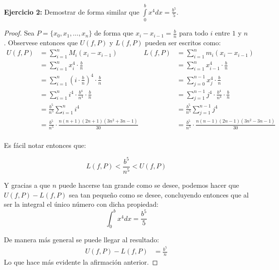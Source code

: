 \documentclass[../../main.tex]{subfiles}
\begin{document}
\question \textbf{Ejercicio 2:} Demostrar de forma similar que $\int\limits_{0}^b x^4 dx = \frac{b^5}{5}$.
\begin{proof}
    Sea $P = \{x_0, x_1, \dots, x_n\}$ de forma que $x_i - x_{i-1} = \frac{b}{n}$ para todo $i$ entre $1$ y $n$. Observese entonces que $U(f, P)$ y $L(f, P)$ pueden ser escritos como:
    \begin{align*}
        U(f, P) &= \sum_{i = 1}^n M_i (x_i-x_{i-1}) & L(f, P) &= \sum_{i = 1}^n m_i (x_i - x_{i-1})\\
        &= \sum_{i = 1}^n x_i^4 \cdot \frac{b}{n} & &= \sum_{i=1}^n x_{i-1}^4 \cdot \frac{b}{n}\\
        &= \sum_{i = 1}^n \left(i \cdot \frac{b}{n}\right)^4 \cdot \frac{b}{n} & &= \sum_{j = 0}^{n-1} x_j^4 \cdot \frac{b}{n}\\
        &= \sum_{i = 1}^n i^4 \cdot \frac{b^4}{n^4} \cdot \frac{b}{n} & &= \sum_{j = 1}^{n-1} j^4 \cdot \frac{b^4}{n^4} \cdot \frac{b}{n}\\
        &= \frac{b^5}{n^5} \sum_{i = 1}^n i^4 & &= \frac{b^5}{n^5} \sum_{j = 1}^{n-1} j^4\\
        &= \frac{b^5}{n^5} \cdot \frac{n  (n+1) (2n+1) (3n^2+3n-1)}{30} & &= \frac{b^5}{n^5} \cdot \frac{n  (n-1)  (2n-1) (3n^2-3n-1)}{30}\\
    \end{align*}

    Es fácil notar entonces que:

    $$L(f, P) < \frac{b^5}{n^5} < U(f, P)$$

    Y gracias a que $n$ puede hacerse tan grande como se desee, podemos hacer que $U(f, P) - L(f, P)$ sea tan pequeño como se desee, concluyendo entonces que al ser la integral el
    único número con dicha propiedad:
    $$\int_0^b x^4 dx = \frac{b^5}{5}$$

    De manera más general se puede llegar al resultado:
    \begin{align*}
        U(f, P) - L(f, P) &= \frac{b^5}{n}
    \end{align*}
    Lo que hace más evidente la afirmación anterior.
\end{proof}
\end{document}
